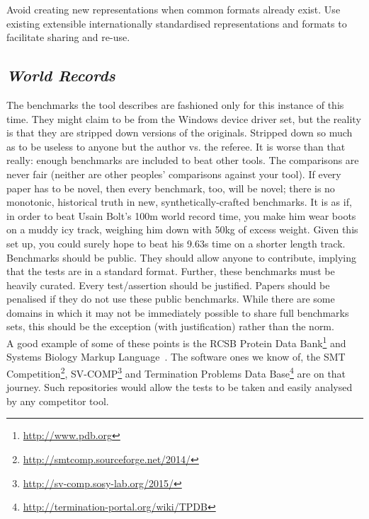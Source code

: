 \documentclass[a4paper,11pt]{article}
\begin{document}
 Avoid creating
new representations when common formats already exist. Use existing
extensible internationally standardised representations and formats to
facilitate sharing and re-use.

\subsection{{\emph{World Records}}}

The benchmarks the tool describes are fashioned only for this instance
of this time. They might claim to be from the Windows device driver
set, but the reality is that they are stripped down versions of the
originals. Stripped down so much as to be useless to anyone but the
author vs. the referee. It is worse than that really: enough
benchmarks are included to beat other tools. The comparisons are never
fair (neither are other peoples' comparisons against your tool). If
every paper has to be novel, then every benchmark, too, will be novel;
there is no monotonic, historical truth in new, synthetically-crafted
benchmarks. It is as if, in order to beat Usain Bolt's
\num{100}\si{\metre} world record time, you make him wear boots on a
muddy icy track, weighing him down with \num{50}\si{\kilogram} of
excess weight. Given this set up, you could surely hope to beat his
\num{9.63}\si{\second} time on a shorter length track.\\

 Benchmarks should
be public. They should allow anyone to contribute, implying that the
tests are in a standard format. Further, these benchmarks must be
heavily curated. Every test/assertion should be justified. Papers
should be penalised if they do not use these public benchmarks. While
there are some domains in which it may not be immediately possible to
share full benchmarks sets, this should be the exception (with
justification) rather than the norm.\\

A good example of some of these points is the RCSB Protein Data
Bank\footnote{\url{http://www.pdb.org}} and Systems Biology Markup
Language~\cite{Chaouiya2013}. The software ones we know of,
the SMT
Competition\footnote{\url{http://smtcomp.sourceforge.net/2014/}},
SV-COMP\footnote{\url{http://sv-comp.sosy-lab.org/2015/}} and
Termination Problems Data
Base\footnote{\url{http://termination-portal.org/wiki/TPDB}} are on
that journey. Such repositories would allow the tests to be taken and
easily analysed by any competitor tool.
\end{document}
